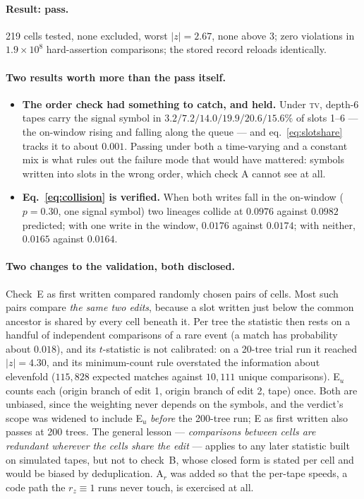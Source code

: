\paragraph{Result: pass.} 219 cells tested, none excluded, worst $|z|=2.67$, none above $3$; zero
violations in $1.9\times10^{8}$ hard-assertion comparisons; the stored record reloads identically.

\paragraph{Two results worth more than the pass itself.}
\begin{itemize}
  \item \textbf{The order check had something to catch, and held.} Under \textsc{tv}, depth-6 tapes
        carry the signal symbol in $3.2/7.2/14.0/19.9/20.6/15.6\%$ of slots 1--6 --- the on-window
        rising and falling along the queue --- and eq.~\eqref{eq:slotshare} tracks it to about
        $0.001$. Passing under both a time-varying and a constant mix is what rules out the failure
        mode that would have mattered: symbols written into slots in the wrong order, which check A
        cannot see at all.
  \item \textbf{Eq.~\eqref{eq:collision} is verified.} When both writes fall in the on-window
        ($p=0.30$, one signal symbol) two lineages collide at $0.0976$ against $0.0982$ predicted;
        with one write in the window, $0.0176$ against $0.0174$; with neither, $0.0165$ against
        $0.0164$.
\end{itemize}

\paragraph{Two changes to the validation, both disclosed.} Check~E as first written compared randomly
chosen pairs of cells. Most such pairs compare \emph{the same two edits}, because a slot written just
below the common ancestor is shared by every cell beneath it. Per tree the statistic then rests on a
handful of independent comparisons of a rare event (a match has probability about $0.018$), and its
$t$-statistic is not calibrated: on a 20-tree trial run it reached $|z|=4.30$, and its
minimum-count rule overstated the information about elevenfold ($115{,}828$ expected matches against
$10{,}111$ unique comparisons). E$_u$ counts each (origin branch of edit 1, origin branch of edit 2,
tape) once. Both are unbiased, since the weighting never depends on the symbols, and the verdict's
scope was widened to include E$_u$ \emph{before} the 200-tree run; E as first written also passes at
200 trees. The general lesson --- \emph{comparisons between cells are redundant wherever the cells
share the edit} --- applies to any later statistic built on simulated tapes, but not to check~B, whose
closed form is stated per cell and would be biased by deduplication. A$_r$ was added so that the
per-tape speeds, a code path the $r_z\equiv1$ runs never touch, is exercised at all.

